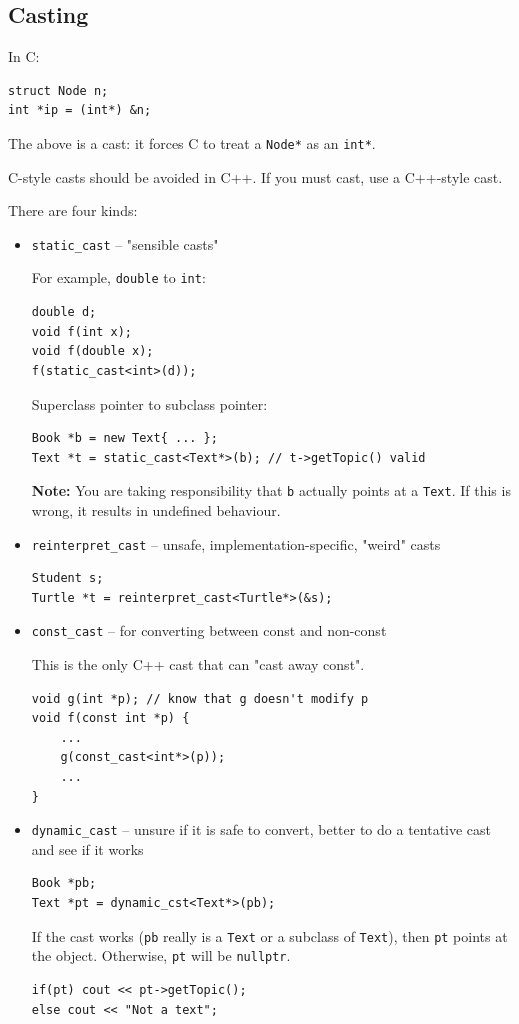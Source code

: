 \documentclass[11pt]{article}
\theoremstyle{definition}
\begin{document}
\subsection{Casting}
In C:
\begin{lstlisting}
struct Node n;
int *ip = (int*) &n; 
\end{lstlisting}\vspace{-1.5ex}
The above is a cast: it forces C to treat a {\tt Node*} as an {\tt int*}.

C-style casts should be avoided in C++. If you must cast, use a C++-style cast. 

There are four kinds:\vspace{-1.5ex}
\begin{itemize}
\item {\tt static\_cast} -- "sensible casts" 

For example, {\tt double} to {\tt int}:
\begin{lstlisting}
double d;
void f(int x);
void f(double x);
f(static_cast<int>(d));
\end{lstlisting}
\vspace{-1ex}
Superclass pointer to subclass pointer:
\begin{lstlisting}
Book *b = new Text{ ... };
Text *t = static_cast<Text*>(b); // t->getTopic() valid
\end{lstlisting}
\vspace{-1ex}
{\bf Note:} You are taking responsibility that {\tt b} actually points at a {\tt Text}. If this is wrong, it results in undefined behaviour.

\item {\tt reinterpret\_cast} -- unsafe, implementation-specific, "weird" casts
\begin{lstlisting}
Student s;
Turtle *t = reinterpret_cast<Turtle*>(&s);
\end{lstlisting}\vspace{-1ex}

\item {\tt const\_cast} -- for converting between const and non-const

This is the only C++ cast that can "cast away const".
\begin{lstlisting}
void g(int *p); // know that g doesn't modify p
void f(const int *p) {
    ...
    g(const_cast<int*>(p));
    ...
}
\end{lstlisting}\vspace{-1ex}

\item {\tt dynamic\_cast} -- unsure if it is safe to convert, better to do a tentative cast and see if it works
\begin{lstlisting}
Book *pb;
Text *pt = dynamic_cst<Text*>(pb);
\end{lstlisting}\vspace{-1ex}
If the cast works ({\tt *pb} really is a {\tt Text} or a subclass of {\tt Text}), then {\tt pt} points at the object. Otherwise, {\tt pt} will be {\tt nullptr}.
\begin{lstlisting}
if(pt) cout << pt->getTopic();
else cout << "Not a text";
\end{lstlisting}


\end{itemize}
\end{document}
